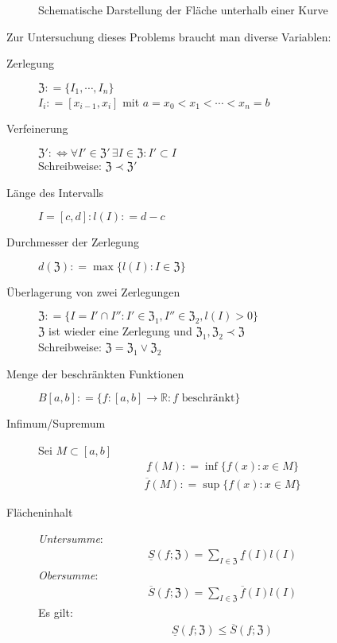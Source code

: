 \documentclass[ngerman,titlepage,twoside, parskip=half*]{scrreprt}
\newcommand*{\R}{\mathbb{R}}
\newcommand*{\ZZ}{\mathfrak{Z}}
\newcommand*{\perdef}{:\Leftrightarrow}
\theoremstyle{plain}
\theoremstyle{definition}
\theoremstyle{remark}
\newcommand*{\coloneqq}{\mathrel{\mathop:}=}
\begin{document}
\begin{figure}[htb]
  \centering
  \caption{Schematische Darstellung der Fläche unterhalb einer Kurve}
  \label{fig:riemann}
\end{figure}

Zur Untersuchung dieses Problems braucht man diverse Variablen:
\begin{description}
  \item[Zerlegung] $\ZZ\coloneqq\{I_1,\cdots,I_n\}$\\
    $I_i\coloneqq[x_{i-1},x_i]$ mit $a=x_0<x_1<\cdots<x_n=b$
  \item[Verfeinerung] $\ZZ'\perdef\forall
    I'\in\ZZ'\,\exists I\in\ZZ\colon I'\subset I$\\
    Schreibweise: $\ZZ\prec\ZZ'$
  \item[Länge des Intervalls] $I=[c,d]\colon l(I)\coloneqq d-c$
  \item[Durchmesser der Zerlegung] $d(\ZZ)\coloneqq\max\{l(I)\colon
    I\in\ZZ\}$
  \item[Überlagerung von zwei Zerlegungen] $\ZZ\coloneqq\{I=I'\cap I''\colon
    I'\in\ZZ_1, I''\in\ZZ_2, l(I)>0\}$\\
    $\ZZ$ ist wieder eine Zerlegung und $\ZZ_1,\ZZ_2\prec\ZZ$\\
    Schreibweise: $\ZZ=\ZZ_1\vee\ZZ_2$
  \item[Menge der beschränkten Funktionen] $B[a,b]\coloneqq\{f\colon
    [a,b]\rightarrow\R\colon f\text{ beschränkt}\}$
  \item[Infimum/Supremum]
    Sei $M\subset[a,b]$\\
    \begin{gather*}\underline{f}(M)\coloneqq\inf\{f(x)\colon x\in M\}\end{gather*}
    \begin{gather*}\overline{f}(M)\coloneqq\sup\{f(x)\colon x\in M\}\end{gather*}
  \item[Flächeninhalt]
    \emph{Untersumme}:
    \begin{gather*}\underline{S}(f;\ZZ)=\sum_{I\in\ZZ}\underline{f}(I)l(I)\end{gather*}
    \emph{Obersumme}:
    \begin{gather*}\overline{S}(f;\ZZ)=\sum_{I\in\ZZ}\overline{f}(I)l(I)\end{gather*}
    Es gilt:
    \begin{gather*}\underline{S}(f;\ZZ)\leq\overline{S}(f;\ZZ)\end{gather*}
\end{description}
\end{document}
